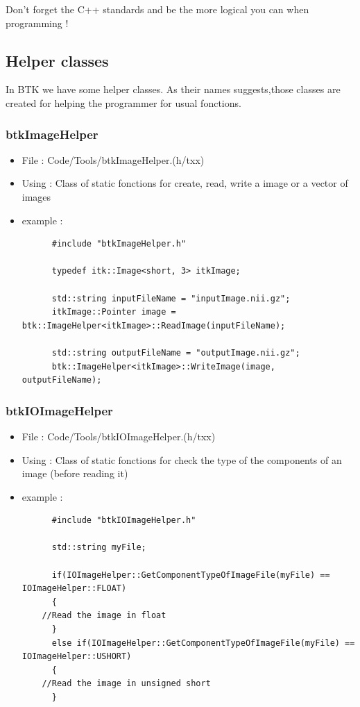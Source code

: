     Don't forget the C++ standards and be the more logical you can when programming !

    \subsection{Helper classes}
    In BTK we have some helper classes. As their names suggests,those classes are created for helping the programmer for usual fonctions.
    \subsubsection{btkImageHelper}
    \begin{itemize}
    \item File : Code/Tools/btkImageHelper.(h/txx)
    \item Using : Class of static fonctions for create, read, write a image or a vector of images
    \item example :
      \begin{verbatim}
      #include "btkImageHelper.h"
                 
      typedef itk::Image<short, 3> itkImage;
      
      std::string inputFileName = "inputImage.nii.gz";      
      itkImage::Pointer image = btk::ImageHelper<itkImage>::ReadImage(inputFileName);
      
      std::string outputFileName = "outputImage.nii.gz";
      btk::ImageHelper<itkImage>::WriteImage(image, outputFileName);

      \end{verbatim}
    \end{itemize}

    \subsubsection{btkIOImageHelper}
    \begin{itemize}
    \item File : Code/Tools/btkIOImageHelper.(h/txx)
    \item Using : Class of static fonctions for check the type of the components of an image (before reading it)
    \item example :
      \begin{verbatim}
      #include "btkIOImageHelper.h"
      
      std::string myFile;

      if(IOImageHelper::GetComponentTypeOfImageFile(myFile) == IOImageHelper::FLOAT)
      {
	//Read the image in float
      }
      else if(IOImageHelper::GetComponentTypeOfImageFile(myFile) == IOImageHelper::USHORT)
      {
	//Read the image in unsigned short
      }
      \end{verbatim}

    \end{itemize}

